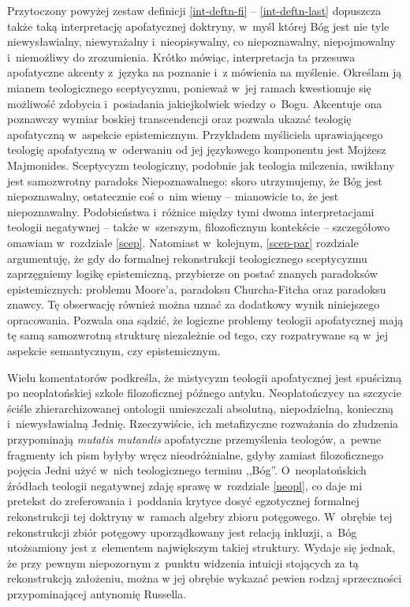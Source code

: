 Przytoczony powyżej zestaw definicji \ref{int-deftn-fi} -- \ref{int-deftn-last} dopuszcza także taką interpretację apofatycznej doktryny, w~myśl której Bóg jest nie tyle niewysławialny, niewyrażalny i~nieopisywalny, co niepoznawalny, niepojmowalny i~niemożliwy do zrozumienia. Krótko mówiąc, interpretacja ta przesuwa apofatyczne akcenty z~języka na poznanie i~z mówienia na myślenie. Określam ją mianem teologicznego sceptycyzmu, ponieważ w~jej ramach kwestionuje się możliwość zdobycia i~posiadania jakiejkolwiek wiedzy o~Bogu. Akcentuje ona poznawczy wymiar boskiej transcendencji oraz pozwala ukazać teologię apofatyczną w~aspekcie epistemicznym. Przykładem myśliciela uprawiającego teologię apofatyczną w~oderwaniu od jej językowego komponentu jest Mojżesz Majmonides. Sceptycyzm teologiczny, podobnie jak teologia milczenia, uwikłany jest samozwrotny paradoks Niepoznawalnego: skoro utrzymujemy, że Bóg jest niepoznawalny, ostatecznie coś o~nim wiemy -- mianowicie to, że jest niepoznawalny. Podobieństwa i~różnice między tymi dwoma interpretacjami teologii negatywnej -- także w~szerszym, filozoficznym kontekście -- szczegółowo omawiam w~rozdziale \ref{scep}. Natomiast w~kolejnym, \ref{scep-par} rozdziale argumentuję, że gdy do formalnej rekonstrukcji teologicznego sceptycyzmu zaprzęgniemy logikę epistemiczną, przybierze on postać znanych paradoksów epistemicznych: problemu Moore'a, paradoksu Churcha-Fitcha oraz paradoksu znawcy. Tę obserwację również można uznać za dodatkowy wynik niniejszego opracowania. Pozwala ona sądzić, że logiczne problemy teologii apofatycznej mają tę samą samozwrotną strukturę niezależnie od tego, czy rozpatrywane są w~jej aspekcie semantycznym, czy epistemicznym.

Wielu komentatorów podkreśla, że mistycyzm teologii apofatycznej jest spuścizną po neoplatońskiej szkole filozoficznej późnego antyku. Neoplatończycy na szczycie ściśle zhierarchizowanej ontologii umieszczali absolutną, niepodzielną, konieczną i~niewysławialną Jednię. Rzeczywiście, ich metafizyczne rozważania do złudzenia przypominają \textit{mutatis mutandis} apofatyczne przemyślenia teologów, a~pewne fragmenty ich pism byłyby wręcz nieodróżnialne, gdyby zamiast filozoficznego pojęcia Jedni użyć w~nich teologicznego terminu ,,Bóg''. O~neoplatońskich źródłach teologii negatywnej zdaję sprawę w~rozdziale \ref{neopl}, co daje mi pretekst do zreferowania i~poddania krytyce dosyć egzotycznej formalnej rekonstrukcji tej doktryny w~ramach algebry zbioru potęgowego. W~obrębie tej rekonstrukcji zbiór potęgowy uporządkowany jest relacją inkluzji, a~Bóg utożsamiony jest z~elementem największym takiej struktury. Wydaje się jednak, że przy pewnym niepozornym z~punktu widzenia intuicji stojących za tą rekonstrukcją założeniu, można w jej obrębie wykazać pewien rodzaj sprzeczności przypominającej antynomię Russella.

